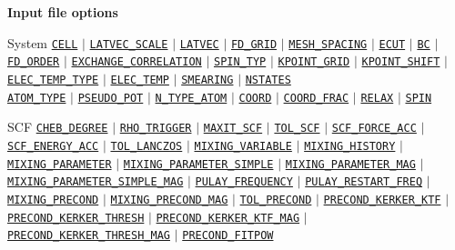 \documentclass[xcolor=dvipsnames,t]{beamer}
\begin{document}
\begin{frame}[allowframebreaks]{\textbf{Input file options}} \label{Index}
\vspace{-2mm}
\begin{block}{System}
\hyperlink{CELL}{\texttt{CELL}} $\vert$ \hyperlink{LATVEC_SCALE}{\texttt{LATVEC\_SCALE}} $\vert$ \hyperlink{LATVEC}{\texttt{LATVEC}}  $\vert$ \hyperlink{FD_GRID}{\texttt{FD\_GRID}} $\vert$ \hyperlink{MESH_SPACING}{\texttt{MESH\_SPACING}} $\vert$ \hyperlink{ECUT}{\texttt{ECUT}} $\vert$ \hyperlink{BC}{\texttt{BC}} $\vert$ \hyperlink{FD_ORDER}{\texttt{FD\_ORDER}} $\vert$ \hyperlink{EXCHANGE_CORRELATION}{\texttt{EXCHANGE\_CORRELATION}} $\vert$ \hyperlink{SPIN_TYP}{\texttt{SPIN\_TYP}} $\vert$ \hyperlink{KPOINT_GRID}{\texttt{KPOINT\_GRID}} $\vert$ \hyperlink{KPOINT_SHIFT}{\texttt{KPOINT\_SHIFT}} $\vert$ \hyperlink{ELEC_TEMP_TYPE}{\texttt{ELEC\_TEMP\_TYPE}} $\vert$ \hyperlink{ELEC_TEMP}{\texttt{ELEC\_TEMP}} $\vert$ \hyperlink{SMEARING}{\texttt{SMEARING}} $\vert$ \hyperlink{NSTATES}{\texttt{NSTATES}} \\
\hyperlink{ATOM_TYPE}{\texttt{ATOM\_TYPE}} $\vert$ \hyperlink{PSEUDO_POT}{\texttt{PSEUDO\_POT}}  $\vert$ \hyperlink{N_TYPE_ATOM}{\texttt{N\_TYPE\_ATOM}} $\vert$ \hyperlink{COORD}{\texttt{COORD}} $\vert$ \hyperlink{COORD_FRAC}{\texttt{COORD\_FRAC}} $\vert$ \hyperlink{RELAX}{\texttt{RELAX}} $\vert$ \hyperlink{SPIN}{\texttt{SPIN}} 
\end{block}

\begin{block}{SCF}
\hyperlink{CHEB_DEGREE}{\texttt{CHEB\_DEGREE}} $\vert$ 
\hyperlink{RHO_TRIGGER}{\texttt{RHO\_TRIGGER}} $\vert$ 
\hyperlink{MAXIT_SCF}{\texttt{MAXIT\_SCF}} $\vert$ 
\hyperlink{TOL_SCF}{\texttt{TOL\_SCF}} $\vert$ 
\hyperlink{SCF_FORCE_ACC}{\texttt{SCF\_FORCE\_ACC}} $\vert$ 
\hyperlink{SCF_ENERGY_ACC}{\texttt{SCF\_ENERGY\_ACC}} $\vert$ 
\hyperlink{TOL_LANCZOS}{\texttt{TOL\_LANCZOS}} $\vert$ 
\hyperlink{MIXING_VARIABLE}{\texttt{MIXING\_VARIABLE}} $\vert$ 
\hyperlink{MIXING_HISTORY}{\texttt{MIXING\_HISTORY}} $\vert$ 
\hyperlink{MIXING_PARAMETER}{\texttt{MIXING\_PARAMETER}} $\vert$ 
\hyperlink{MIXING_PARAMETER_SIMPLE}{\texttt{MIXING\_PARAMETER\_SIMPLE}} $\vert$ 
\hyperlink{MIXING_PARAMETER_MAG}{\texttt{MIXING\_PARAMETER\_MAG}} $\vert$
\hyperlink{MIXING_PARAMETER_SIMPLE_MAG}{\texttt{MIXING\_PARAMETER\_SIMPLE\_MAG}} $\vert$
\hyperlink{PULAY_FREQUENCY}{\texttt{PULAY\_FREQUENCY}} $\vert$ 
\hyperlink{PULAY_RESTART_FREQ}{\texttt{PULAY\_RESTART\_FREQ}} $\vert$ 
\hyperlink{MIXING_PRECOND}{\texttt{MIXING\_PRECOND}} $\vert$ 
\hyperlink{MIXING_PRECOND_MAG}{\texttt{MIXING\_PRECOND\_MAG}} $\vert$ 
\hyperlink{TOL_PRECOND}{\texttt{TOL\_PRECOND}} $\vert$ 
\hyperlink{PRECOND_KERKER_KTF}{\texttt{PRECOND\_KERKER\_KTF}} $\vert$ 
\hyperlink{PRECOND_KERKER_THRESH}{\texttt{PRECOND\_KERKER\_THRESH}} $\vert$ 
\hyperlink{PRECOND_KERKER_KTF_MAG}{\texttt{PRECOND\_KERKER\_KTF\_MAG}} $\vert$ 
\hyperlink{PRECOND_KERKER_THRESH\_MAG}{\texttt{PRECOND\_KERKER\_THRESH\_MAG}} $\vert$ 
\hyperlink{PRECOND_FITPOW}{\texttt{PRECOND\_FITPOW}}
\end{block}


\end{frame}
\end{document}
